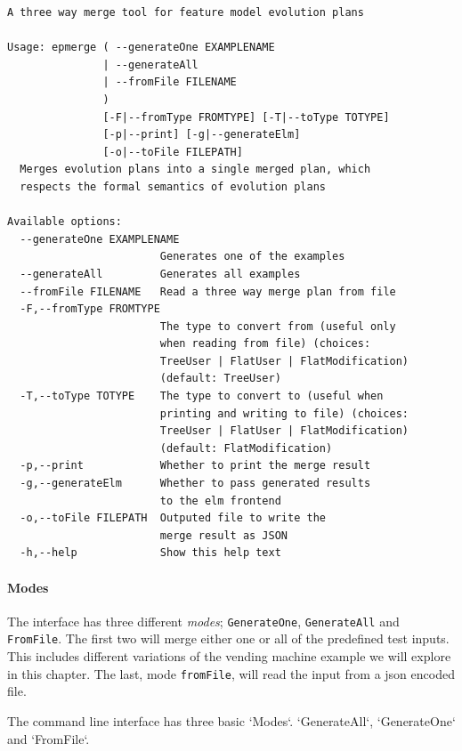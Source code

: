 \documentclass[a4paper,english]{ifimaster}
\begin{document}
\begin{verbatim}
A three way merge tool for feature model evolution plans

Usage: epmerge ( --generateOne EXAMPLENAME 
               | --generateAll 
               | --fromFile FILENAME
               )
               [-F|--fromType FROMTYPE] [-T|--toType TOTYPE] 
               [-p|--print] [-g|--generateElm] 
               [-o|--toFile FILEPATH]
  Merges evolution plans into a single merged plan, which 
  respects the formal semantics of evolution plans

Available options:
  --generateOne EXAMPLENAME
                        Generates one of the examples
  --generateAll         Generates all examples
  --fromFile FILENAME   Read a three way merge plan from file
  -F,--fromType FROMTYPE   
                        The type to convert from (useful only 
                        when reading from file) (choices: 
                        TreeUser | FlatUser | FlatModification) 
                        (default: TreeUser)
  -T,--toType TOTYPE    The type to convert to (useful when 
                        printing and writing to file) (choices: 
                        TreeUser | FlatUser | FlatModification) 
                        (default: FlatModification)
  -p,--print            Whether to print the merge result
  -g,--generateElm      Whether to pass generated results 
                        to the elm frontend
  -o,--toFile FILEPATH  Outputed file to write the 
                        merge result as JSON
  -h,--help             Show this help text
\end{verbatim}

\paragraph{Modes}%
\label{par:modes}

The interface has three different \textit{modes}; \texttt{GenerateOne}, \texttt{GenerateAll} and \texttt{FromFile}. The first two will merge either one or all of the predefined test inputs. This includes different variations of the vending machine example we will explore in this chapter. The last, mode \texttt{fromFile}, will read the input from a json encoded file.

The command line interface has three basic `Modes`. `GenerateAll`, `GenerateOne` and `FromFile`.
\end{document}
